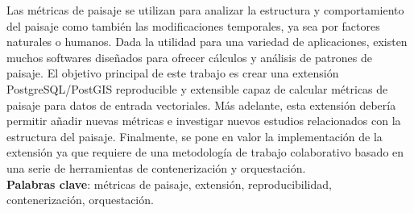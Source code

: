 
\begin{resumen}
Las métricas de paisaje se utilizan para analizar la estructura y comportamiento del paisaje como también las modificaciones temporales, ya sea por factores naturales o humanos. Dada la utilidad para una variedad de aplicaciones, existen muchos softwares diseñados para ofrecer cálculos y análisis de patrones de paisaje. El objetivo principal de este trabajo es crear una extensión PostgreSQL/PostGIS reproducible y extensible capaz de calcular métricas de paisaje para datos de entrada vectoriales. Más adelante, esta extensión debería permitir añadir nuevas métricas e investigar nuevos estudios relacionados con la estructura del paisaje. Finalmente, se pone en valor la implementación de la extensión ya que requiere de una metodología de trabajo colaborativo basado en una serie de herramientas de contenerización y orquestación.\\


\textbf{Palabras clave}: métricas de paisaje, extensión, reproducibilidad, contenerización, orquestación.


\end{resumen}
